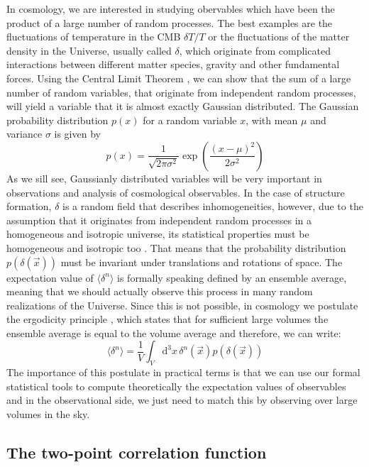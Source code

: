 In cosmology, we are interested in studying obervables which have been the product of a large number of random processes.
The best examples are the fluctuations of temperature in the CMB $\delta T / T$ or the fluctuations of the matter density in the Universe, 
usually called $\delta$, which originate from complicated interactions between different matter species, gravity and other fundamental forces.
Using the Central Limit Theorem \cite{(cite...)}, we can show that the sum of a large number of random variables, that originate from independent random processes, will yield a variable that it is almost exactly Gaussian distributed. The Gaussian probability distribution $p(x)$ for a random variable $x$, with mean $\mu$ and variance $\sigma$ is given by
\begin{equation}
p(x) = \frac{1}{\sqrt{2 \pi \sigma^2}}\exp\left( \frac{(x-\mu)^2}{2\sigma^2} \right)
\end{equation}
As we sill see, Gaussianly distributed variables will be very important in observations and analysis of cosmological observables.
In the case of structure formation, $\delta$ is a random field that describes inhomogeneities, however, due to the 
assumption that it originates from independent random processes in a homogeneous and isotropic universe,
its statistical properties must be homogeneous and isotropic too \cite{(cite...Peacock, Bjoern, ?)}.
That means that the probability distribution $p(\delta(\vec{x}))$ must be invariant under translations and rotations of space.
The expectation value of $\langle \delta^n \rangle$ is formally speaking defined by an ensemble average, meaning that
we should actually observe this process in many random realizations of the Universe. Since this is not possible,
in cosmology we postulate the ergodicity principle \cite{(cite Adler...)}, which states that for sufficient large volumes
the ensemble average is equal to the volume average and therefore, we can write:
\begin{equation}
\langle \delta^n \rangle = \frac{1}{V} \int_V \mathrm{d}^3 x \, \delta^n (\vec{x}) p(\delta (\vec{x}))
\end{equation} 
The importance of this postulate in practical terms is that we can use our formal statistical tools 
to compute theoretically the expectation values
of observables and in the observational side, we just need to match this by observing over large volumes in the sky.

\subsection{The two-point correlation function}

